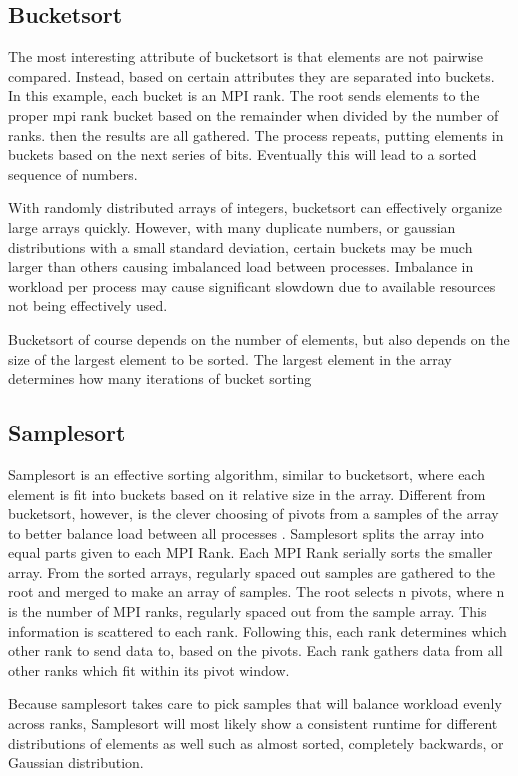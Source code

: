 \documentclass[10pt,letterpaper]{article}
\begin{document}
\begin{multicols}{2}
\subsection{Bucketsort}
The most interesting attribute of bucketsort is that elements are not pairwise compared. Instead, based on certain attributes they are separated into buckets. In this example, each bucket is an MPI rank. The root sends elements to the proper mpi rank bucket based on the remainder when divided by the number of ranks. then the results are all gathered. The process repeats, putting elements in buckets based on the next series of bits. Eventually this will lead to a sorted sequence of numbers.

With randomly distributed arrays of integers, bucketsort can effectively organize large arrays quickly. However, with many duplicate numbers, or gaussian distributions with a small standard deviation, certain buckets may be much larger than others causing imbalanced load between processes. Imbalance in workload per process may cause significant slowdown due to available resources not being effectively used.

Bucketsort of course depends on the number of elements, but also depends on the size of the largest element to be sorted. The largest element in the array determines how many iterations of bucket sorting 
\subsection{Samplesort}
Samplesort is an effective sorting algorithm, similar to bucketsort, where each element is fit into buckets based on it relative size in the array. Different from bucketsort, however, is the clever choosing of pivots from a samples of the array to better balance load between all processes
\cite{samplesort}. Samplesort splits the array into equal parts given to each MPI Rank. Each MPI Rank serially sorts the smaller array. From the sorted arrays, regularly spaced out samples are gathered to the root and merged to make an array of samples. The root selects n pivots, where n is the number of MPI ranks, regularly spaced out from the sample array. This information is scattered to each rank. Following this, each rank determines which other rank to send data to, based on the pivots. Each rank gathers data from all other ranks which fit within its pivot window. 

Because samplesort takes care to pick samples that will balance workload evenly across ranks, Samplesort will most likely show a consistent runtime for different distributions of elements as well such as almost sorted, completely backwards, or Gaussian distribution.

\end{multicols}
\end{document}
